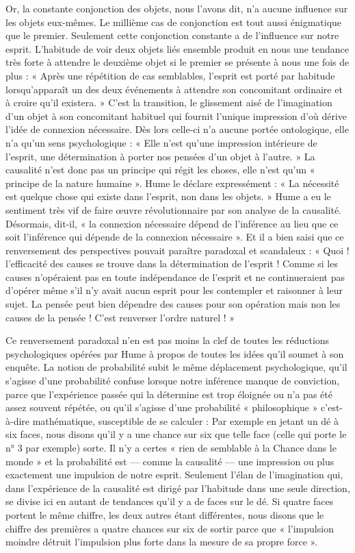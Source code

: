 Or, la constante conjonction des objets, nous l’avons
dit, n’a aucune influence sur les objets eux-mêmes. Le
millième cas de conjonction est tout aussi énigmatique
que le premier. Seulement cette conjonction constante a
de l'influence sur notre esprit. L’habitude de voir deux
objets liés ensemble produit en nous une tendance très
forte à attendre le deuxième objet si le premier se présente
à nous une fois de plus : « Après une répétition de cas
semblables, l’esprit est porté par habitude lorsqu’apparaît
un des deux événements à attendre son concomitant
ordinaire et à croire qu’il existera. » C’est la transition,
le glissement aisé de l’imagination d’un objet à son concomitant 
habituel qui fournit l’unique impression d’où
dérive l’idée de connexion nécessaire. Dès lors celle-ci
n’a aucune portée ontologique, elle n’a qu’un sens 
psychologique : « Elle n’est qu’une impression intérieure de
l'esprit, une détermination à porter nos pensées d’un objet
à l’autre. » La causalité n’est donc pas un principe qui
régit les choses, elle n’est qu’un « principe de la nature
humaine ». Hume le déclare expressément : « La nécessité
est quelque chose qui existe dans l’esprit, non dans les
objets. » Hume a eu le sentiment très vif de faire œuvre
révolutionnaire par son analyse de la causalité. Désormais,
dit-il, « la connexion nécessaire dépend de l’inférence au
lieu que ce soit l’inférence qui dépende de la connexion
nécessaire ». Et il a bien saisi que ce renversement des
perspectives pouvait paraître paradoxal et scandaleux :
« Quoi ! l'efficacité des causes se trouve dans la détermination 
de l’esprit ! Comme si les causes n’opéraient pas en
toute indépendance de l'esprit et ne continueraient pas
d’opérer même s’il n’y avait aucun esprit pour les contempler 
et raisonner à leur sujet. La pensée peut bien dépendre
des causes pour son opération mais non les causes de la
pensée ! C’est renverser l’ordre naturel ! »

Ce renversement paradoxal n’en est pas moins la clef
de toutes les réductions psychologiques opérées par Hume
à propos de toutes les idées qu’il soumet à son enquête.
La notion de probabilité subit le même déplacement
psychologique, qu’il s’agisse d’une probabilité confuse
lorsque notre inférence manque de conviction, parce que
l'expérience passée qui la détermine est trop éloignée ou
n’a pas été assez souvent répétée, ou qu’il s’agisse d’une
probabilité « philosophique » c’est-à-dire mathématique,
susceptible de se calculer : Par exemple en jetant un dé
à six faces, nous disons qu’il y a une chance sur six que
telle face (celle qui porte le n° 3 par exemple) sorte. Il
n’y a certes « rien de semblable à la Chance dans le monde »
et la probabilité est — comme la causalité — une impression ou plus exactement une impulsion de notre esprit.
Seulement l'élan de l’imagination qui, dans l’expérience
de la causalité est dirigé par l'habitude dans une seule
direction, se divise ici en autant de tendances qu’il y a
de faces sur le dé. Si quatre faces portent le même chiffre,
les deux autres étant différentes, nous disons que le chiffre
des premières a quatre chances sur six de sortir parce que
« l'impulsion moindre détruit l’impulsion plus forte dans
la mesure de sa propre force ».

